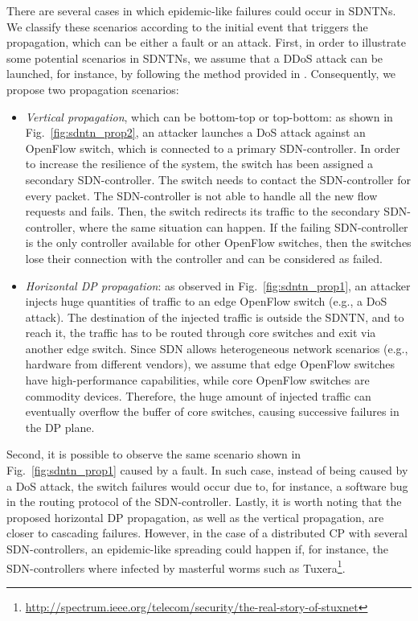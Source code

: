 \documentclass[10pt,draftclsnofoot,onecolumn,journal]{IEEEtran}
\begin{document}
There are several cases in which epidemic-like failures could occur in SDNTNs. We classify these scenarios according to the initial event that triggers the propagation, which can be either a fault or an attack. First, in order to illustrate some potential scenarios in SDNTNs, we assume that a DDoS attack can be launched, for instance, by following the method provided in \cite{attacking2013SDN}. Consequently, we propose two propagation scenarios:
\begin{itemize}
	\item \emph{Vertical propagation}, which can be bottom-top or top-bottom: as shown in Fig.~\ref{fig:sdntn_prop2}, an attacker launches a DoS attack against an OpenFlow switch, which is connected to a primary SDN-controller. In order to increase the resilience of the system, the switch has been assigned a secondary SDN-controller. The switch needs to contact the SDN-controller for every packet. The SDN-controller is not able to handle all the new flow requests and fails. Then, the switch redirects its traffic to the secondary SDN-controller, where the same situation can happen. If the failing SDN-controller is the only controller available for other OpenFlow switches, then the switches lose their connection with the controller and can be considered as failed.
	\item \emph{Horizontal DP propagation}: as observed in Fig.~\ref{fig:sdntn_prop1}, an attacker injects huge quantities of traffic to an edge OpenFlow switch (e.g., a DoS attack). The destination of the injected traffic is outside the SDNTN, and to reach it, the traffic has to be routed through core switches and exit via another edge switch. Since SDN allows heterogeneous network scenarios (e.g., hardware from different vendors), we assume that edge OpenFlow switches have high-performance capabilities, while core OpenFlow switches are commodity devices. Therefore, the huge amount of injected traffic can eventually overflow the buffer of core switches, causing successive failures in the DP plane.
\end{itemize}
Second, it is possible to observe the same scenario shown in Fig.~\ref{fig:sdntn_prop1} caused by a fault. In such case, instead of being caused by a DoS attack, the switch failures would occur due to, for instance, a software bug in the routing protocol of the SDN-controller. Lastly, it is worth noting that the proposed horizontal DP propagation, as well as the vertical propagation, are closer to cascading failures. However, in the case of a distributed CP with several SDN-controllers, an epidemic-like spreading could happen if, for instance, the SDN-controllers where infected by masterful worms such as Tuxera\footnote{\url{http://spectrum.ieee.org/telecom/security/the-real-story-of-stuxnet}}.
\end{document}
